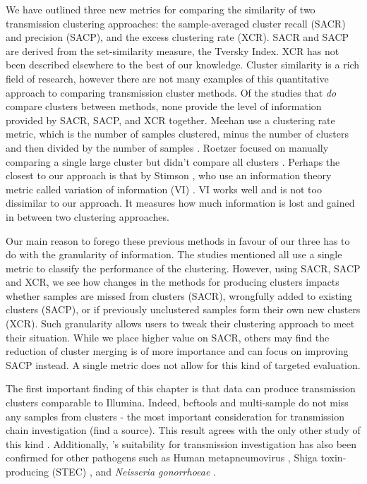 We have outlined three new metrics for comparing the similarity of two transmission clustering approaches: the sample-averaged cluster recall (SACR) and precision (SACP), and the excess clustering rate (XCR). SACR and SACP are derived from the set-similarity measure, the Tversky Index. XCR has not been described elsewhere to the best of our knowledge. Cluster similarity is a rich field of research, however there are not many examples of this quantitative approach to comparing transmission cluster methods. Of the studies that \emph{do} compare clusters between methods, none provide the level of information provided by SACR, SACP, and XCR together. Meehan \etal{} use a clustering rate metric, which is the number of samples clustered, minus the number of clusters and then divided by the number of samples \cite{meehan2018}. Roetzer \etal{} focused on manually comparing a single large cluster but didn't compare all clusters \cite{roetzer2013}. Perhaps the closest to our approach is that by Stimson \etal{} \cite{stimson2019}, who use an information theory metric called variation of information (VI) \cite{meila2007}. VI works well and is not too dissimilar to our approach. It measures how much information is lost and gained in between two clustering approaches.

Our main reason to forego these previous methods in favour of our three has to do with the granularity of information. The studies mentioned all use a single metric to classify the performance of the clustering. However, using SACR, SACP and XCR, we see how changes in the methods for producing clusters impacts whether samples are missed from clusters (SACR), wrongfully added to existing clusters (SACP), or if previously unclustered samples form their own new clusters (XCR). Such granularity allows users to tweak their clustering approach to meet their situation. While we place higher value on SACR, others may find the reduction of cluster merging is of more importance and can focus on improving SACP instead. A single metric does not allow for this kind of targeted evaluation.

The first important finding of this chapter is that \ont{} data can produce transmission clusters comparable to Illumina. Indeed, bcftools and \pandora{} multi-sample do not miss any samples from clusters - the most important consideration for transmission chain investigation (find a source). This result agrees with the only other \mtb{} study of this kind \cite{smith2020}. Additionally, \ont{}'s suitability for transmission investigation has also been confirmed for other pathogens such as Human metapneumovirus \cite{xu2020}, Shiga toxin-producing \ecoli{} (STEC) \cite{greig2021}, and \textit{Neisseria gonorrhoeae} \cite{sanderson2020}.

